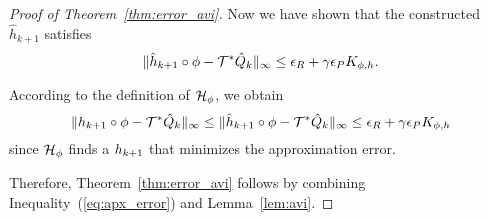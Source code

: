 \begin{proof}[Proof of Theorem~\ref{thm:error_avi}]
Now we have shown that the constructed $\hat{h}_{k+1}$ satisfies 
\begin{equation}
    \|\hat{h}_{k+1}\circ \phi - \mathcal{T}^* \hat{Q}_k \|_\infty \leq \epsilon_R + \gamma \epsilon_P K_{\phi,h}.
\end{equation}

According to the definition of $\mathcal{H}_{\phi}$, we obtain
\begin{equation}
\label{eq:apx_error}
    \|h_{k+1}\circ \phi - \mathcal{T}^* \hat{Q}_k \|_\infty \leq \|\hat{h}_{k+1}\circ \phi - \mathcal{T}^* \hat{Q}_k \|_\infty \leq \epsilon_R + \gamma \epsilon_P K_{\phi,h}
\end{equation}
since $\mathcal{H}_{\phi}$ finds a $h_{k+1}$ that minimizes the approximation error.

Therefore, Theorem~\ref{thm:error_avi} follows by combining Inequality~(\ref{eq:apx_error}) and Lemma~\ref{lem:avi}.

\end{proof}
